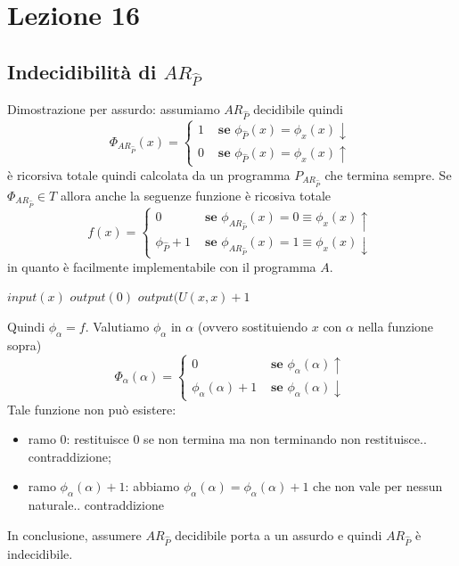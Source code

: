 \documentclass{article}
\begin{document}
\section{Lezione 16}
\subsection{Indecidibilità di $AR_{\hat{P}}$}
Dimostrazione per assurdo: assumiamo $AR_{\hat{P}}$ decidibile quindi
\begin{displaymath}
	\Phi_{AR_{\hat{P}}}(x)=\begin{cases}
		1 &\textbf{ se } \phi_{\hat{P}}(x)=\phi_x (x) \downarrow \\
		0 &\textbf{ se } \phi_{\hat{P}}(x)=\phi_x (x) \uparrow
	\end{cases}
\end{displaymath}
è ricorsiva totale quindi calcolata da un programma $P_{AR_{\hat{P}}}$ che termina sempre. Se $\Phi_{AR_{\hat{P}}} \in T$ allora anche la seguenze funzione è ricosiva totale
\begin{displaymath}
	f(x)=\begin{cases}
		0 &\textbf{ se } \phi_{AR_{\hat{P}}}(x)=0 \equiv \phi_x (x) \uparrow \\
		\phi_{\hat{P}}+1 &\textbf{ se } \phi_{AR_{\hat{P}}}(x)=1 \equiv \phi_x (x) \downarrow 
		
	\end{cases}
\end{displaymath}
in quanto è facilmente implementabile con il programma $A$.
\begin{algorithm}[!h]
	\caption{$A$}
        \begin{algorithmic}[1]
        		 \State $input(x)$
        		 	\State $output(0)$
        		 \Else
        		 	\State $output(U(x,x)+1$
        		 \EndIf
        \end{algorithmic}
    \end{algorithm}
    
Quindi $\phi_\alpha=f$. Valutiamo $\phi_\alpha$ in $\alpha$ (ovvero sostituiendo $x$ con $\alpha$ nella funzione sopra)
\begin{displaymath}
	\Phi_{\alpha}(\alpha)=\begin{cases}
		0 &\textbf{ se } \phi_\alpha (\alpha) \uparrow \\
		\phi_\alpha (\alpha)+1 &\textbf{ se } \phi_\alpha (\alpha) \downarrow 
		
	\end{cases}
\end{displaymath}
Tale funzione non può esistere: 
\begin{itemize}
	\item ramo 0: restituisce 0 se non termina ma non terminando non restituisce.. contraddizione;
	\item ramo $\phi_\alpha (\alpha)+1$: abbiamo $\phi_\alpha (\alpha) = \phi_\alpha (\alpha)+1$ che non vale per nessun naturale.. contraddizione
\end{itemize}
In conclusione, assumere $AR_{\hat{P}}$ decidibile porta a un assurdo e quindi $AR_{\hat{P}}$ è indecidibile.
\end{document}
